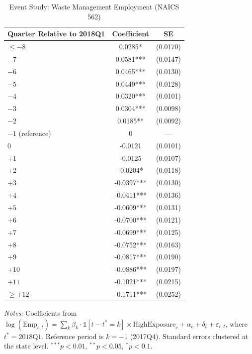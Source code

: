 \begin{table}[t]
\centering
\caption{Event Study: Waste Management Employment (NAICS 562)}
\label{tab:eventstudy}
\begin{threeparttable}
\small
\begin{tabular}{lcc}
\hline\hline
Quarter Relative to 2018Q1 & Coefficient & SE \\
\hline
$\leq -8$ & 0.0285* & (0.0170) \\
$-7$ & 0.0581*** & (0.0147) \\
$-6$ & 0.0465*** & (0.0130) \\
$-5$ & 0.0449*** & (0.0128) \\
$-4$ & 0.0320*** & (0.0101) \\
$-3$ & 0.0304*** & (0.0098) \\
$-2$ & 0.0185** & (0.0092) \\
\hline
$-1$ (reference) & 0 & --- \\
$0$ & -0.0121 & (0.0101) \\
$+1$ & -0.0125 & (0.0107) \\
$+2$ & -0.0204* & (0.0118) \\
$+3$ & -0.0397*** & (0.0130) \\
$+4$ & -0.0411*** & (0.0136) \\
$+5$ & -0.0609*** & (0.0131) \\
$+6$ & -0.0700*** & (0.0121) \\
$+7$ & -0.0699*** & (0.0125) \\
$+8$ & -0.0752*** & (0.0163) \\
$+9$ & -0.0817*** & (0.0190) \\
$+10$ & -0.0886*** & (0.0197) \\
$+11$ & -0.1021*** & (0.0215) \\
$\geq +12$ & -0.1711*** & (0.0252) \\
\hline\hline
\end{tabular}
\begin{tablenotes}
\item \textit{Notes:} Coefficients from $\log(\text{Emp}_{c,t}) = \sum_k \beta_k \cdot \mathbb{1}[t-t^* = k] \times \text{HighExposure}_c + \alpha_c + \delta_t + \varepsilon_{c,t}$, where $t^* = 2018\text{Q1}$. Reference period is $k = -1$ (2017Q4). Standard errors clustered at the state level. $^{***}p<0.01$, $^{**}p<0.05$, $^{*}p<0.1$.
\end{tablenotes}
\end{threeparttable}
\end{table}
